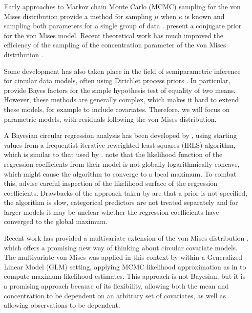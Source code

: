 \documentclass[11pt,a4paper]{article}\usepackage[]{graphicx}\usepackage[]{color}
\begin{document}
Early approaches to Markov chain Monte Carlo (MCMC) sampling for the von Mises distribution provide a method for sampling \( \mu \) when \( \kappa \) is known \citep{mardia1976bayesian} and sampling both parameters for a single group of data \citep{damien1999fullbayes}. \citet{guttorp1988finding} present a conjugate prior for the von Mises model. Recent theoretical work has much improved the efficiency of the sampling of the concentration parameter of the von Mises distribution \citep{forbes2015fast}.

Some development has also taken place in the field of semiparametric inference for circular data models, often using Dirichlet process priors \citep{Bhattacharya2009, ghosh2003semiparametric, george2006semiparametric, mcvinish2008semiparametric}. In particular, \citet{ghosh2003semiparametric} provide Bayes factors for the simple hypothesis test of equality of two means. However, these methods are generally complex, which makes it hard to extend these models, for example to include covariates. Therefore, we will focus on parametric models, with residuals following the von Mises distribution.

A Bayesian circular regression analysis has been developed by \citet{gill2010}, using starting values from a frequentist iterative reweighted least squares (IRLS) algorithm, which is similar to that used by \citet{fisher1992regression}. \citet{gill2010} note that the likelihood function of the regression coefficients from their model is not globally logarithmically concave, which might cause the algorithm to converge to a local maximum. To combat this, \citet{gill2010} advise careful inspection of the likelihood surface of the regression coefficients. Drawbacks of the approach taken by \citet{gill2010} are that a prior is not specified, the algorithm is slow, categorical predictors are not treated separately and for larger models it may be unclear whether the regression coefficients have converged to the global maximum.

Recent work has provided a multivariate extension of the von Mises distribution \citep{mardia2008multivariate,mardia2014some}, which offers a promising new way of thinking about circular covariate models. The multivariate von Mises was applied in this context by \citet{lagona2016regression} within a Generalized Linear Model (GLM) setting, applying MCMC likelihood approximation as in \citet{geyer1992constrained} to compute maximum likelihood estimates. This approach is not Bayesian, but it is a promising approach because of its flexibility, allowing both the mean and concentration to be dependent on an arbitrary set of covariates, as well as allowing observations to be dependent.
\end{document}
